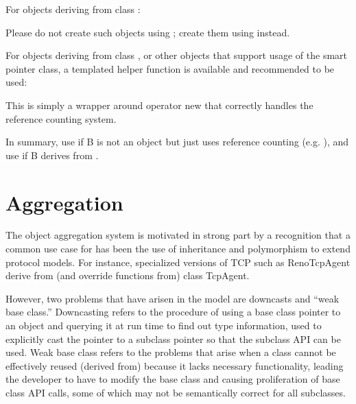 \documentclass[letterpaper,10pt,english]{sphinxmanual}
\renewcommand{\sphinxcode}[1]{\texttt{\small{#1}}}
\begin{document}
For objects deriving from class \sphinxcode{}:

\begin{sphinxVerbatim}[commandchars=\\\{\}]
    
\end{sphinxVerbatim}

Please do not create such objects using \sphinxcode{}; create them using
\sphinxcode{} instead.

For objects deriving from class \sphinxcode{}, or other objects
that support usage of the smart pointer class, a templated helper function is
available and recommended to be used:

\begin{sphinxVerbatim}[commandchars=\\\{\}]
    
\end{sphinxVerbatim}

This is simply a wrapper around operator new that correctly handles the
reference counting system.

In summary, use \sphinxcode{} if B is not an object but just uses reference
counting (e.g. \sphinxcode{}), and use \sphinxcode{\sphinxupquote{CreateObject\textless{}B\textgreater{}}} if B derives
from \sphinxcode{}.


\section{Aggregation}
\label{\detokenize{object-model:aggregation}}
The  object aggregation system is motivated in strong part by a recognition
that a common use case for  has been the use of inheritance and
polymorphism to extend protocol models. For instance, specialized versions of
TCP such as RenoTcpAgent derive from (and override functions from) class
TcpAgent.

However, two problems that have arisen in the  model are downcasts and
“weak base class.” Downcasting refers to the procedure of using a base class
pointer to an object and querying it at run time to find out type information,
used to explicitly cast the pointer to a subclass pointer so that the subclass
API can be used. Weak base class refers to the problems that arise when a class
cannot be effectively reused (derived from) because it lacks necessary
functionality, leading the developer to have to modify the base class and
causing proliferation of base class API calls, some of which may not be
semantically correct for all subclasses.
\end{document}

